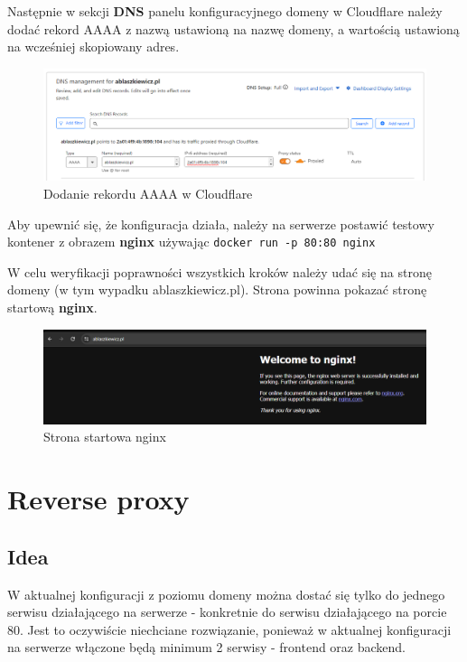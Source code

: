 \documentclass{article}
\begin{document}
Następnie w sekcji \textbf{DNS} panelu konfiguracyjnego domeny w Cloudflare należy dodać rekord AAAA z nazwą ustawioną na nazwę domeny, a wartością ustawioną na wcześniej skopiowany adres.

\begin{figure}[H]
    \centering
    \includegraphics[width=1\linewidth]{ipv6cloudflare.png}
    \caption{Dodanie rekordu AAAA w Cloudflare}
    \label{fig:enter-label}
\end{figure}

Aby upewnić się, że konfiguracja działa, należy na serwerze postawić testowy kontener z obrazem \textbf{nginx} używając \lstinline|docker run -p 80:80 nginx|


W celu weryfikacji poprawności wszystkich kroków należy udać się na stronę domeny (w tym wypadku ablaszkiewicz.pl). Strona powinna pokazać stronę startową \textbf{nginx}.

\begin{figure}[H]
    \centering
    \includegraphics[width=1\linewidth]{ipv6helloWorld.png}
    \caption{Strona startowa nginx}
    \label{fig:enter-label}
\end{figure}


\section{Reverse proxy}

\subsection{Idea}

W aktualnej konfiguracji z poziomu domeny można dostać się tylko do jednego serwisu działającego na serwerze - konkretnie do serwisu działającego na porcie 80. Jest to oczywiście niechciane rozwiązanie, ponieważ w aktualnej konfiguracji na serwerze włączone będą minimum 2 serwisy - frontend oraz backend.
\end{document}
